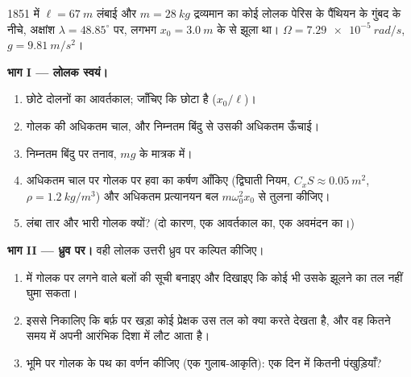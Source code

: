 \begin{problem}
\label{pb:b1:non-inertial-frames:1}
1851 में $\ell = \qty{67}{m}$ लंबाई और $m = \qty{28}{kg}$ द्रव्यमान का कोई
लोलक पेरिस के पैंथियन के गुंबद के नीचे, अक्षांश $\lambda =
48.85^\circ$ पर, लगभग $x_0 = \qty{3.0}{m}$ के  से झूला था। $\Omega =
\qty{7.29e-5}{rad/s}$, $g = \qty{9.81}{m/s^2}$।

\medskip
\noindent\textbf{भाग I --- लोलक स्वयं।}
\begin{enumerate}
  \item छोटे दोलनों का आवर्तकाल; जाँचिए कि  छोटा है
        ($x_0/\ell$)।
  \item गोलक की अधिकतम चाल, और निम्नतम बिंदु से उसकी अधिकतम ऊँचाई।
  \item निम्नतम बिंदु पर तनाव, $mg$ के मात्रक में।
  \item अधिकतम चाल पर गोलक पर हवा का कर्षण आँकिए (द्विघाती नियम,
        $C_xS \approx \qty{0.05}{m^2}$, $\rho = \qty{1.2}{kg/m^3}$) और
        अधिकतम प्रत्यानयन बल $m\omega_0^2x_0$ से तुलना कीजिए।
  \item लंबा तार और भारी गोलक क्यों? (दो कारण, एक आवर्तकाल का, एक
        अवमंदन का।)
\end{enumerate}

\medskip
\noindent\textbf{भाग II --- ध्रुव पर।}
वही लोलक उत्तरी ध्रुव पर कल्पित कीजिए।
\begin{enumerate}[resume]
  \item {} में गोलक पर लगने वाले बलों की सूची बनाइए और
        दिखाइए कि कोई भी उसके झूलने का तल नहीं घुमा सकता।
  \item इससे निकालिए कि बर्फ़ पर खड़ा कोई प्रेक्षक उस तल को क्या करते
        देखता है, और वह कितने समय में अपनी आरंभिक दिशा में लौट आता है।
  \item भूमि पर गोलक के पथ का वर्णन कीजिए (एक गुलाब-आकृति): एक दिन में
        कितनी पंखुड़ियाँ?
\end{enumerate}


\end{problem}
